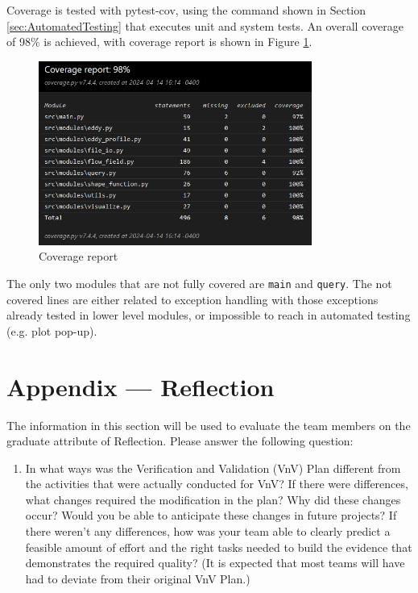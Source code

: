 \documentclass[12pt, titlepage]{article}
\begin{document}
Coverage is tested with pytest-cov, using the command shown in Section \ref{sec:AutomatedTesting} that executes unit and system tests. An overall coverage of 98\% is achieved, with coverage report is shown in Figure \ref{fig:coverage}. 

\begin{figure}[h!]
\begin{center}
  \includegraphics[width=0.8\textwidth]{img/coverage.png}
  \caption{Coverage report}
  \label{fig:coverage}
\end{center}
\end{figure}

The only two modules that are not fully covered are \texttt{main} and \texttt{query}. The not covered lines are either related to exception handling with those exceptions already tested in lower level modules, or impossible to reach in automated testing (e.g. plot pop-up).




\newpage{}
\section*{Appendix --- Reflection}

The information in this section will be used to evaluate the team members on the
graduate attribute of Reflection.  Please answer the following question:

\begin{enumerate}
  \item In what ways was the Verification and Validation (VnV) Plan different
  from the activities that were actually conducted for VnV?  If there were
  differences, what changes required the modification in the plan?  Why did
  these changes occur?  Would you be able to anticipate these changes in future
  projects?  If there weren't any differences, how was your team able to clearly
  predict a feasible amount of effort and the right tasks needed to build the
  evidence that demonstrates the required quality?  (It is expected that most
  teams will have had to deviate from their original VnV Plan.)
\end{enumerate}
\end{document}
